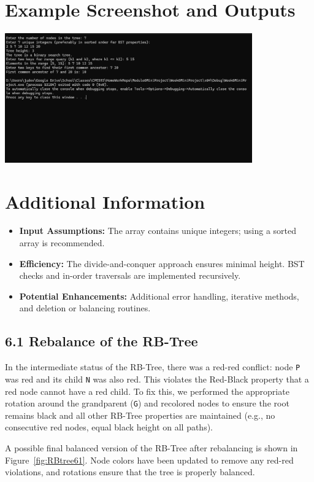 \documentclass[11pt]{article}
\begin{document}
	\section{Example Screenshot and Outputs}
	\includegraphics[width=0.8\textwidth]{images/screenshot1.png}
	
	
	\section{Additional Information}
	\begin{itemize}
		\item \textbf{Input Assumptions:} The array contains unique integers; using a sorted array is recommended.
		\item \textbf{Efficiency:} The divide-and-conquer approach ensures minimal height. BST checks and in-order traversals are implemented recursively.
		\item \textbf{Potential Enhancements:} Additional error handling, iterative methods, and deletion or balancing routines.
	\end{itemize}
	
	\newpage
	
	\subsection*{6.1 Rebalance of the RB-Tree}
	\label{sec:rbfix}
	
	In the intermediate status of the RB-Tree, there was a red-red conflict: node \texttt{P} was red and its child \texttt{N} was also red. This violates the Red-Black property that a red node cannot have a red child. To fix this, we performed the appropriate rotation around the grandparent (\texttt{G}) and recolored nodes to ensure the root remains black and all other RB-Tree properties are maintained (e.g., no consecutive red nodes, equal black height on all paths).
	
	A possible final balanced version of the RB-Tree after rebalancing is shown in Figure~\ref{fig:RBtree61}. Node colors have been updated to remove any red-red violations, and rotations ensure that the tree is properly balanced.
	
\end{document}
